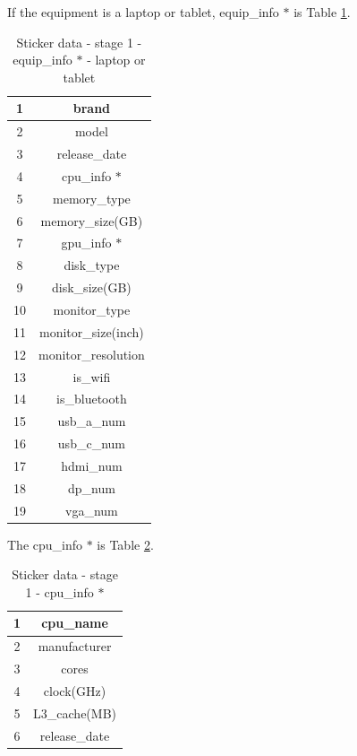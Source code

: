 \documentclass[a4paper,11pt]{article}
\begin{document}
\noindent If the equipment is a laptop or tablet, equip\_info $*$ is Table \ref{table:sticker_data_stage_1_equip_info_laptop}.
\begin{table}[h!]
	\begin{center}
		\begin{tabular}{ | c | c | }
			\hline
			1 & brand \\ 
			\hline
			2 & model  \\  
			\hline
			3 & release\_date \\
			\hline
			4 & cpu\_info $*$ \\ 
			\hline
			5 &  memory­\_type \\  
			\hline
			6 & memory\_size(GB) \\
			\hline
			7 & gpu­\_info $*$ \\  
			\hline
			8 & disk\_type \\
			\hline
			9 & disk\_size(GB) \\
			\hline
			10 & monitor­\_type \\  
			\hline
			11 & monitor\_size(inch) \\ 
			\hline
			12 & monitor\_resolution  \\  
			\hline
			13 & is\_wifi \\
			\hline
			14 & is\_bluetooth \\ 
			\hline
			15 & usb\_a\_num \\  
			\hline
			16 & usb\_c\_num \\
			\hline
			17 & hdmi\_num \\
			\hline
			18 & dp\_num \\  
			\hline
			19 & vga\_num \\  
			\hline
		\end{tabular}
		\caption{Sticker data \-- stage 1 \-- equip\_info $*$ \-- laptop or tablet}
		\label{table:sticker_data_stage_1_equip_info_laptop}
	\end{center}
\end{table}

\noindent The cpu\_info $*$ is Table \ref{table:sticker_data_stage_1_cpu_info}.
\begin{table}[h!]
	\begin{center}
		\begin{tabular}{ | c | c | }
			\hline
			1 & cpu\_name \\ 
			\hline
			2 & manufacturer  \\  
			\hline
			3 & cores \\
			\hline
			4 & clock(GHz) \\ 
			\hline
			5 & L3\_cache(MB) \\  
			\hline
			6 & release\_date \\
			\hline
		\end{tabular}
		\caption{Sticker data \-- stage 1 \-- cpu\_info $*$}
		\label{table:sticker_data_stage_1_cpu_info}
	\end{center}
\end{table}
\end{document}
